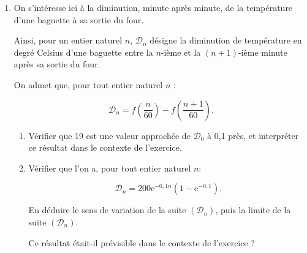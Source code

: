 \documentclass[10pt]{article}
\providecommand{\e}{{\mathrm{e}}}
\begin{document}
\begin{enumerate}
\item On s’intéresse ici à la diminution, minute après minute, de la température d’une baguette à sa sortie du four.

Ainsi, pour un entier naturel $n$, $\mathcal{D}_n$ désigne la diminution de température en degré Celsius d’une baguette entre la $n$-ième et la $(n+1)$-ième minute après sa sortie du four.

On admet que, pour tout entier naturel $n$ : 

\[\mathcal{D}_n=f\left(\dfrac{n}{60}\right)-f\left(\dfrac{n+1}{60}\right).\]

\smallskip

	\begin{enumerate}
		\item Vérifier que 19 est une valeur approchée de $\mathcal{D}_0$ à 0,1 près, et interpréter ce résultat dans le contexte de l’exercice.
\item Vérifier que l’on a, pour tout entier naturel $n$: 

\[\mathcal{D}_n = 200 \e^{-0,1n}\left(1 - \e^{-0,1}\right).\]

En déduire le sens de variation de la suite $\left(\mathcal{D}_n\right)$, puis la limite de la suite $\left(\mathcal{D}_n\right)$.

Ce résultat était-il prévisible dans le contexte de l’exercice ?

		\end{enumerate}
\end{enumerate}
\end{document}
